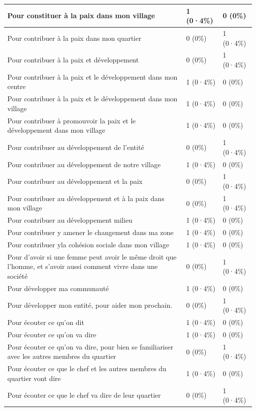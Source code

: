 \documentclass[
]{book}
\begin{document}
\begin{tabular}{l|l|l}
\hline
Pour constituer à la paix dans mon village & 1 (0·4\%) & 0 (0\%)\\
\hline
Pour contribuer à la paix dans mon quartier & 0 (0\%) & 1 (0·4\%)\\
\hline
Pour contribuer à la paix et développement & 0 (0\%) & 1 (0·4\%)\\
\hline
Pour contribuer à la paix et le développement dans mon centre & 1 (0·4\%) & 0 (0\%)\\
\hline
Pour contribuer à la paix et le développement dans mon village & 1 (0·4\%) & 0 (0\%)\\
\hline
Pour contribuer à promouvoir la paix et le développement dans mon village & 1 (0·4\%) & 0 (0\%)\\
\hline
Pour contribuer au développement de l'entité & 0 (0\%) & 1 (0·4\%)\\
\hline
Pour contribuer au développement de notre village & 1 (0·4\%) & 0 (0\%)\\
\hline
Pour contribuer au développement et  la paix & 0 (0\%) & 1 (0·4\%)\\
\hline
Pour contribuer au développement et à la paix dans mon village & 0 (0\%) & 1 (0·4\%)\\
\hline
Pour contribuer au développement milieu & 1 (0·4\%) & 0 (0\%)\\
\hline
Pour contribuer y amener le changement dans ma zone & 1 (0·4\%) & 0 (0\%)\\
\hline
Pour contribuer yla cohésion sociale dans mon village & 1 (0·4\%) & 0 (0\%)\\
\hline
Pour d'avoir si une femme peut avoir le  même droit que l'homme, et s'avoir aussi comment vivre dans une société & 0 (0\%) & 1 (0·4\%)\\
\hline
Pour développer ma communauté & 1 (0·4\%) & 0 (0\%)\\
\hline
Pour développer mon entité, pour aider mon prochain. & 0 (0\%) & 1 (0·4\%)\\
\hline
Pour écouter ce qu'on dit & 1 (0·4\%) & 0 (0\%)\\
\hline
Pour écouter ce qu'on va dire & 1 (0·4\%) & 0 (0\%)\\
\hline
Pour écouter ce qu'on va dire, pour bien se familiariser avec les autres membres du quartier & 0 (0\%) & 1 (0·4\%)\\
\hline
Pour écouter ce que le chef et les autres membres du quartier vont dire & 1 (0·4\%) & 0 (0\%)\\
\hline
Pour écouter ce que le chef va dire de leur quartier & 0 (0\%) & 1 (0·4\%)\\

\end{tabular}
\end{document}
